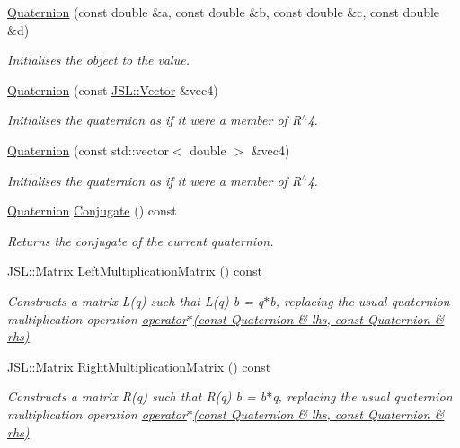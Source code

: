 \begin{DoxyCompactItemize}
\hyperlink{classQDynamics_1_1Quaternion_aadf267f7d62df09bf09b04cc47704560}{Quaternion} (const double \&a, const double \&b, const double \&c, const double \&d)
\begin{DoxyCompactList}\small\item\em Initialises the object to the value. \end{DoxyCompactList}\item 
\hyperlink{classQDynamics_1_1Quaternion_a0a153753fb53bf466a5b1c6ab20abff6}{Quaternion} (const \hyperlink{classJSL_1_1Vector}{J\+S\+L\+::\+Vector} \&vec4)
\begin{DoxyCompactList}\small\item\em Initialises the quaternion as if it were a member of R$^\wedge$4. \end{DoxyCompactList}\item 
\hyperlink{classQDynamics_1_1Quaternion_ad0da33a229eb9869a4b48c8302f5470e}{Quaternion} (const std\+::vector$<$ double $>$ \&vec4)
\begin{DoxyCompactList}\small\item\em Initialises the quaternion as if it were a member of R$^\wedge$4. \end{DoxyCompactList}\item 
\hyperlink{classQDynamics_1_1Quaternion}{Quaternion} \hyperlink{classQDynamics_1_1Quaternion_a2516e87ebb14ee2d34bc22744057c87b}{Conjugate} () const
\begin{DoxyCompactList}\small\item\em Returns the conjugate of the current quaternion. \end{DoxyCompactList}\item 
\hyperlink{classJSL_1_1Matrix}{J\+S\+L\+::\+Matrix} \hyperlink{classQDynamics_1_1Quaternion_a2d0f1e0e8e46d1223f848da4f8b3fc2e}{Left\+Multiplication\+Matrix} () const
\begin{DoxyCompactList}\small\item\em Constructs a matrix L(q) such that L(q) b = q$\ast$b, replacing the usual quaternion multiplication operation \hyperlink{namespaceQDynamics_ac40010112506831ced816640def9bc85}{operator$\ast$(const Quaternion \& lhs, const Quaternion \& rhs)} \end{DoxyCompactList}\item 
\hyperlink{classJSL_1_1Matrix}{J\+S\+L\+::\+Matrix} \hyperlink{classQDynamics_1_1Quaternion_a76da0390b336de90b27e713c34a3732a}{Right\+Multiplication\+Matrix} () const
\begin{DoxyCompactList}\small\item\em Constructs a matrix R(q) such that R(q) b = b$\ast$q, replacing the usual quaternion multiplication operation \hyperlink{namespaceQDynamics_ac40010112506831ced816640def9bc85}{operator$\ast$(const Quaternion \& lhs, const Quaternion \& rhs)} \end{DoxyCompactList}\item 

\end{DoxyCompactItemize}
